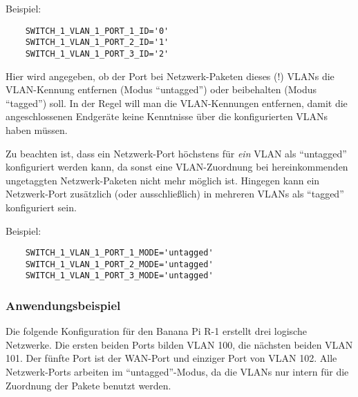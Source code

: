 \begin{description}
Beispiel:

\begin{example}
\begin{verbatim}
    SWITCH_1_VLAN_1_PORT_1_ID='0'
    SWITCH_1_VLAN_1_PORT_2_ID='1'
    SWITCH_1_VLAN_1_PORT_3_ID='2'
\end{verbatim}
\end{example}


Hier wird angegeben, ob der Port bei Netzwerk-Paketen dieses (!) VLANs die
VLAN-Kennung entfernen (Modus ``untagged'') oder beibehalten (Modus ``tagged'')
soll. In der Regel will man die VLAN-Kennungen entfernen, damit die
angeschlossenen Endgeräte keine Kenntnisse über die konfigurierten VLANs haben
müssen.

Zu beachten ist, dass ein Netzwerk-Port höchstens für \emph{ein} VLAN als
``untagged'' konfiguriert werden kann, da sonst eine VLAN-Zuordnung bei
hereinkommenden ungetaggten Netzwerk-Paketen nicht mehr möglich ist. Hingegen
kann ein Netzwerk-Port zusätzlich (oder ausschließlich) in mehreren VLANs als
``tagged'' konfiguriert sein.

Beispiel:

\begin{example}
\begin{verbatim}
    SWITCH_1_VLAN_1_PORT_1_MODE='untagged'
    SWITCH_1_VLAN_1_PORT_2_MODE='untagged'
    SWITCH_1_VLAN_1_PORT_3_MODE='untagged'
\end{verbatim}
\end{example}

\end{description}

\subsubsection{Anwendungsbeispiel}

Die folgende Konfiguration für den Banana Pi R-1 erstellt drei logische
Netzwerke. Die ersten beiden Ports bilden VLAN 100, die nächsten beiden VLAN
101. Der fünfte Port ist der WAN-Port und einziger Port von VLAN 102. Alle
Netzwerk-Ports arbeiten im ``untagged''-Modus, da die VLANs nur intern für die
Zuordnung der Pakete benutzt werden.

